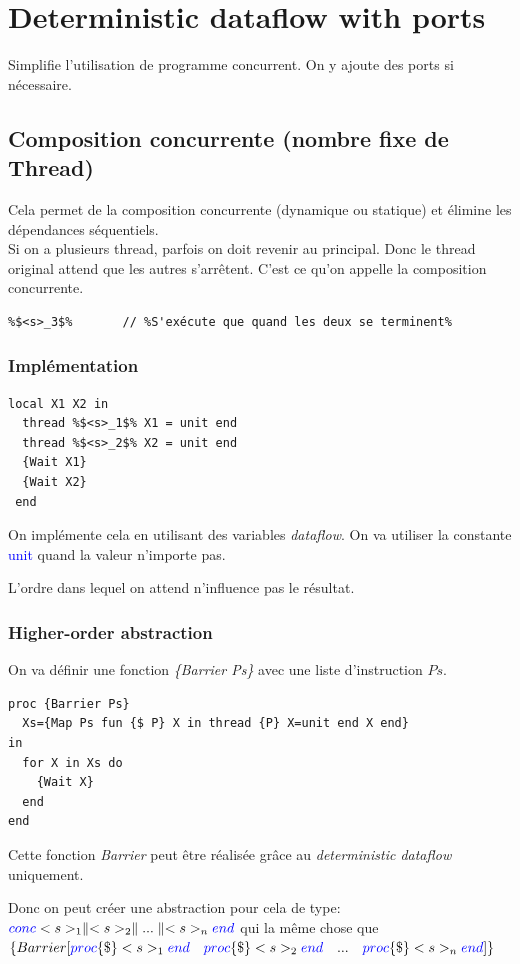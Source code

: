 \documentclass{report}
\begin{document}
\section{Deterministic dataflow with ports}
Simplifie l'utilisation de programme concurrent. On y ajoute des ports si nécessaire.

\subsection{Composition concurrente (nombre fixe de Thread)}
Cela permet de la composition concurrente (dynamique ou statique) et élimine les dépendances séquentiels.\\
Si on a plusieurs thread, parfois on doit revenir au principal. Donc le thread original attend que les autres s'arrêtent. C'est ce qu'on appelle la composition concurrente.
\begin{lstlisting}[escapechar=\%]
%$(<s>_1 \parallel <s>_2)$%  	 // %Crée deux threads et attend que les deux se terminent%
%$<s>_3$%		// %S'exécute que quand les deux se terminent%
\end{lstlisting}

\subsubsection{Implémentation}
\begin{lstlisting}[escapechar=\%]
local X1 X2 in
  thread %$<s>_1$% X1 = unit end
  thread %$<s>_2$% X2 = unit end
  {Wait X1}
  {Wait X2}
 end
\end{lstlisting}
On implémente cela en utilisant des variables \textit{dataflow}. On va utiliser la constante \textcolor{blue}{unit} quand la valeur n'importe pas.\par 
L'ordre dans lequel on attend n'influence pas le résultat.

\subsubsection{Higher-order abstraction}
On va définir une fonction \textit{\{Barrier Ps\}} avec une liste d'instruction $Ps$.
\begin{lstlisting}[escapechar=\%]
proc {Barrier Ps} 
  Xs={Map Ps fun {$ P} X in thread {P} X=unit end X end}
in 
  for X in Xs do 
    {Wait X} 
  end
end
\end{lstlisting}
Cette fonction \textit{Barrier} peut être réalisée grâce au \textit{deterministic dataflow} uniquement.\par 
Donc on peut créer une abstraction pour cela de type: $\textcolor{blue}{conc} <s>_1 \parallel <s>_2 \parallel ... \parallel <s>_n \textcolor{blue}{end}$ qui la même chose que $\{Barrier [\textcolor{blue}{proc} \{\$\} <s>_1 \textcolor{blue}{end} \quad \textcolor{blue}{proc} \{\$\} <s>_2 \textcolor{blue}{end} \quad ... \quad \textcolor{blue}{proc} \{\$\} <s>_n \textcolor{blue}{end} ]\}$
\end{document}

